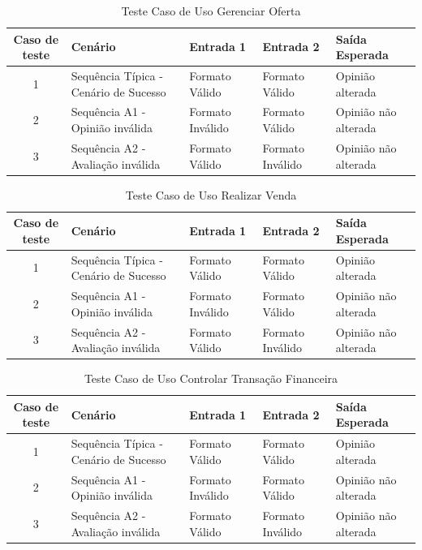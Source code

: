 \documentclass[a4paper,11pt]{article}
\begin{document}
	\begin{center}
	\begin{table}[H]
		\begin{tabularx}{\textwidth}{|c|X|X|X|X|} \hline
			\textbf{Caso de teste} & \textbf{Cenário} & \textbf{Entrada 1} & \textbf{Entrada 2} & \textbf{Saída Esperada} \\
			\hline
			1 & Sequência Típica - Cenário de Sucesso & Formato Válido & Formato Válido & Opinião alterada\\ \hline
			2 & Sequência A1 - Opinião inválida & Formato Inválido & Formato Válido & Opinião não alterada\\ \hline
			3 & Sequência A2 - Avaliação inválida & Formato Válido & Formato Inválido & Opinião não alterada\\ \hline
			
		\end{tabularx}
		\caption{Teste Caso de Uso Gerenciar Oferta}
	\end{table}
	\end{center}
	
	\begin{center}
	\begin{table}[H]
		\begin{tabularx}{\textwidth}{|c|X|X|X|X|} \hline
			\textbf{Caso de teste} & \textbf{Cenário} & \textbf{Entrada 1} & \textbf{Entrada 2} & \textbf{Saída Esperada} \\
			\hline
			1 & Sequência Típica - Cenário de Sucesso & Formato Válido & Formato Válido & Opinião alterada\\ \hline
			2 & Sequência A1 - Opinião inválida & Formato Inválido & Formato Válido & Opinião não alterada\\ \hline
			3 & Sequência A2 - Avaliação inválida & Formato Válido & Formato Inválido & Opinião não alterada\\ \hline
			
		\end{tabularx}
		\caption{Teste Caso de Uso Realizar Venda}
	\end{table}
	\end{center}
	
	\begin{center}
	\begin{table}[H]
		\begin{tabularx}{\textwidth}{|c|X|X|X|X|} \hline
			\textbf{Caso de teste} & \textbf{Cenário} & \textbf{Entrada 1} & \textbf{Entrada 2} & \textbf{Saída Esperada} \\
			\hline
			1 & Sequência Típica - Cenário de Sucesso & Formato Válido & Formato Válido & Opinião alterada\\ \hline
			2 & Sequência A1 - Opinião inválida & Formato Inválido & Formato Válido & Opinião não alterada\\ \hline
			3 & Sequência A2 - Avaliação inválida & Formato Válido & Formato Inválido & Opinião não alterada\\ \hline
			
		\end{tabularx}
		\caption{Teste Caso de Uso Controlar Transação Financeira}
	\end{table}
	\end{center}
	
\end{document}
